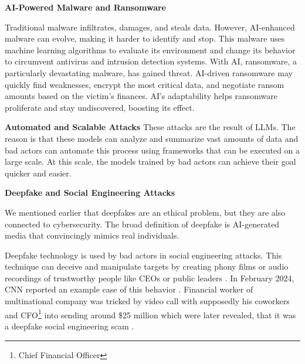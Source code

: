 \textbf{AI-Powered Malware and Ransomware}

Traditional malware infiltrates, damages, and steals data. However, AI-enhanced malware can evolve, making it harder to identify and stop. This malware uses machine learning algorithms to evaluate its environment and change its behavior to circumvent antivirus and intrusion detection systems.
With AI, ransomware, a particularly devastating malware, has gained threat. AI-driven ransomware may quickly find weaknesses, encrypt the most critical data, and negotiate ransom amounts based on the victim's finances. AI's adaptability helps ransomware proliferate and stay undiscovered, boosting its effect\cite{Princess-Egbuna_2021}.

\textbf{Automated and Scalable Attacks}
These attacks are the result of LLMs. The reason is that these models can analyze and summarize vast amounts of data and bad actors can automate this process using frameworks that can be executed on a large scale. At this scale, the models trained by bad actors can achieve their goal quicker and easier.

\textbf{Deepfake and Social Engineering Attacks}

We mentioned earlier that deepfakes are an ethical problem, but they are also connected to cybersecurity. The broad definition of deepfake is AI-generated media that convincingly mimics real individuals.

Deepfake technology is used by bad actors in social engineering attacks. This technique can deceive and manipulate targets by creating phony films or audio recordings of trustworthy people like CEOs or public leaders \cite{Princess-Egbuna_2021}. In February 2024, CNN reported an example case of this behavior \cite{deepfake_CFO}. Financial worker of multinational company was tricked by video call with supposedly his coworkers and CFO\footnote{Chief Financial Officer} into sending around \$25 million which were later revealed, that it was a deepfake social engineering scam \cite{deepfake_CFO}.

